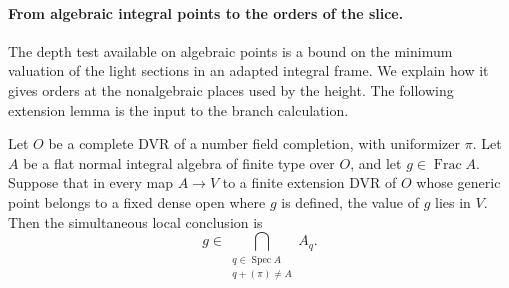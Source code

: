 \paragraph{From algebraic integral points to the orders of the slice.}
\label{par:slice-valued-orders}
The depth test available on algebraic points is a bound on the minimum valuation of the light sections in an adapted integral frame. We explain how
it gives orders at the nonalgebraic places used by the height.
The following extension lemma is the input to the branch calculation.

\begin{lemma}\label{lem:slice-valuative-extension}
Let \(O\) be a complete
DVR of a number field completion, with uniformizer \(\pi\).
Let \(A\) be a flat normal integral algebra of finite type over
\(O\), and let \(g\in\operatorname{Frac}A\). Suppose that in
every map \(A\to V\) to a finite extension DVR of \(O\) whose
generic point belongs to a fixed dense open where \(g\) is
defined, the value of \(g\) lies in \(V\). Then the simultaneous local conclusion is
\[
 g\in\bigcap_{\substack{q\in\operatorname{Spec}A\\ q+(\pi)\ne A}}A_q.
\]


\end{lemma}

